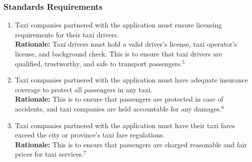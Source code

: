 \documentclass[]{article}
\begin{document}
\subsubsection{Standards Requirements}
\label{ssub:standards_requirements}
\begin{enumerate}[{LR-STD}1. ]
	\item Taxi companies partnered with the application must ensure licensing requirements for their taxi drivers.\\
	{\bf Rationale:} Taxi drivers must hold a valid driver's license, taxi operator's license, and background check. This is to ensure that taxi drivers are qualified, trustworthy, and safe to transport passengers.$^5$
	\item Taxi companies partnered with the application must have adequate insurance coverage to protect all passengers in any taxi.\\
	{\bf Rationale:} This is to ensure that passengers are protected in case of accidents, and taxi companies are held accountable for any damages.$^6$
	\item Taxi companies partnered with the application must have their taxi fares exceed the city or province's taxi fare regulations.\\
	{\bf Rationale:} This is to ensure that passengers are charged reasonable and fair prices for taxi services.$^7$
\end{enumerate}



\appendix
\end{document}
